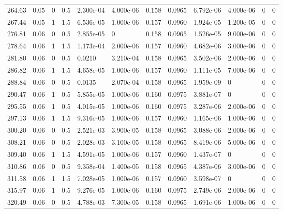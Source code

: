 \documentclass[preview]{standalone}
\begin{document}
{{{\begin{tabular}{L{1.2cm}C{1.2cm} C{0.3cm}C{0.5cm} C{1.4cm}C{1.4cm} C{1.4cm}C{1.4cm} C{1.6cm}C{1.6cm} C{1.6cm}C{1.6cm}}
  264.63  &  0.05  & 0     & 0.5 &  2.300e-04  & 4.000e-06  &  0.158&   0.0965& 6.792e-06 & 4.000e-06   &  0 & 0  \\ 
  267.44  &  0.05  & 1     & 1.5 &  6.536e-05  & 1.000e-06  &  0.157&   0.0960& 1.924e-05 & 1.200e-05   &  0 & 0  \\ 
  276.81  &  0.06  & 0     & 0.5 &  2.855e-05  & 0  &  0.158&   0.0965& 1.526e-05 & 9.000e-06   &  0 & 0  \\ 
  278.64  &  0.06  & 1     & 1.5 &  1.173e-04  & 2.000e-06  &  0.157&   0.0960& 4.682e-06 & 3.000e-06   &  0 & 0  \\ 
  281.80  &  0.06  & 0     & 0.5 &  0.0210  & 3.210e-04  &  0.158&   0.0965& 3.502e-06 & 2.000e-06   &  0 & 0  \\ 
  286.82  &  0.06  & 1     & 1.5 &  4.658e-05  & 1.000e-06  &  0.157&   0.0960& 1.111e-05 & 7.000e-06   &  0 & 0  \\ 
  288.84  &  0.06  & 0     & 0.5 &  0.0135  & 2.070e-04  &  0.158&   0.0965& 1.959e-09 & 0   &  0 & 0  \\ 
  290.47  &  0.06  & 1     & 0.5 &  5.855e-05  & 1.000e-06  &  0.160&   0.0975& 3.881e-07 & 0   &  0 & 0  \\ 
  295.55  &  0.06  & 1     & 0.5 &  4.015e-05  & 1.000e-06  &  0.160&   0.0975& 3.287e-06 & 2.000e-06   &  0 & 0  \\ 
  297.13  &  0.06  & 1     & 1.5 &  9.316e-05  & 1.000e-06  &  0.157&   0.0960& 1.165e-06 & 1.000e-06   &  0 & 0  \\ 
  300.20  &  0.06  & 0     & 0.5 &  2.521e-03  & 3.900e-05  &  0.158&   0.0965& 3.088e-06 & 2.000e-06   &  0 & 0  \\ 
  308.21  &  0.06  & 0     & 0.5 &  2.028e-03  & 3.100e-05  &  0.158&   0.0965& 8.419e-06 & 5.000e-06   &  0 & 0  \\ 
  309.40  &  0.06  & 1     & 1.5 &  4.591e-05  & 1.000e-06  &  0.157&   0.0960& 1.437e-07 & 0   &  0 & 0  \\ 
  310.86  &  0.06  & 0     & 0.5 &  9.358e-04  & 1.400e-05  &  0.158&   0.0965& 4.387e-06 & 3.000e-06   &  0 & 0  \\ 
  311.58  &  0.06  & 1     & 1.5 &  7.028e-05  & 1.000e-06  &  0.157&   0.0960& 3.598e-07 & 0   &  0 & 0  \\ 
  315.97  &  0.06  & 1     & 0.5 &  9.276e-05  & 1.000e-06  &  0.160&   0.0975& 2.749e-06 & 2.000e-06   &  0 & 0  \\ 
  320.49  &  0.06  & 0     & 0.5 &  4.788e-03  & 7.300e-05  &  0.158&   0.0965& 1.691e-06 & 1.000e-06   &  0 & 0  \\ 

\end{tabular}}}}
\end{document}
